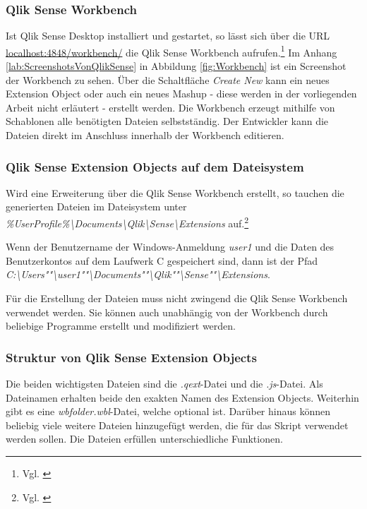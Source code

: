 \subsubsection{Qlik Sense Workbench}
\label{lab:QlikSenseWorkbench} 

Ist Qlik Sense Desktop installiert und gestartet, so lässt sich über die URL \url{localhost:4848/workbench/} die Qlik Sense Workbench aufrufen.\footnote{Vgl. \cite{QlikSenseWorkbench,LaunchingQlikSenseWorkbench, QlikTipsExtensionsInQlikSense}} Im Anhang \ref{lab:ScreenshotsVonQlikSense} in Abbildung \ref{fig:Workbench} ist ein Screenshot der Workbench zu sehen. Über die Schaltfläche \textit{Create New} kann ein neues Extension Object oder auch ein neues Mashup - diese werden in der vorliegenden Arbeit nicht erläutert - erstellt werden.
Die Workbench erzeugt mithilfe von Schablonen alle benötigten Dateien selbstständig. Der Entwickler kann die Dateien direkt im Anschluss innerhalb der Workbench editieren.

\subsubsection{Qlik Sense Extension Objects auf dem Dateisystem}

Wird eine Erweiterung über die Qlik Sense Workbench erstellt, so tauchen die generierten Dateien im Datei\-system unter \textit{\%UserProfile\%\textbackslash{}Documents\textbackslash{}Qlik\textbackslash{}Sense\textbackslash{}Extensions} auf.\footnote{Vgl. \cite{QlikTipsExtensionsInQlikSense}}

Wenn der Benutzername der Windows-Anmeldung \textit{user1} und die Daten des Benutzerkontos auf dem Laufwerk C gespeichert sind, dann ist der Pfad \textit{C:\textbackslash{}Users""\textbackslash{}user1""\textbackslash{}Documents""\textbackslash{}Qlik""\textbackslash{}Sense""\textbackslash{}Extensions}.


Für die Erstellung der Dateien muss nicht zwingend die Qlik Sense Workbench verwendet werden. Sie können auch unabhängig von der Workbench durch beliebige Programme erstellt und modifiziert werden.

\subsubsection{Struktur von Qlik Sense Extension Objects}

Die beiden wichtigsten Dateien sind die \textit{.qext}-Datei und die \textit{.js}-Datei. Als Datei\-namen erhalten beide den exakten Namen des Extension Objects. Weiterhin gibt es eine \textit{wbfolder.wbl}-Datei, welche optional ist. Darüber hinaus können beliebig viele weitere Dateien hinzugefügt werden, die für das Skript verwendet werden sollen. Die Dateien erfüllen unterschiedliche Funktionen.

